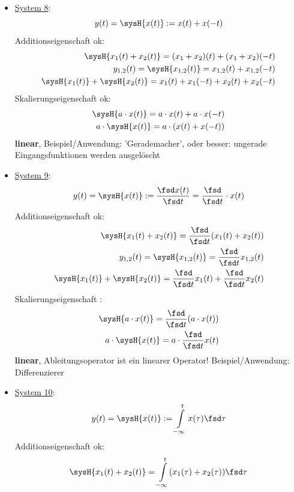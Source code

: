 \begin{Loesung}
\begin{itemize}
\item  \underline{System 8}:
\begin{equation}
y(t) = \sysH{x(t)}:= x(t) + x(-t)
\end{equation}
Additionseigenschaft ok:
\begin{align}
\sysH{x_1(t)+x_2(t)}=(x_1+x_2)(t)+(x_1+x_2)(-t)\\
y_{1,2}(t) = \sysH{x_{1,2}(t)}= x_{1,2}(t)+x_{1,2}(-t)\\
\sysH{x_1(t)} + \sysH{x_2(t)} = x_{1}(t)+x_{1}(-t) + x_{2}(t)+x_{2}(-t)
\end{align}
Skalierungseigenschaft ok:
\begin{align}
\sysH{a \cdot x(t)}= a \cdot x(t) + a \cdot x(-t)\\
a \cdot \sysH{x(t)}= a \cdot (x(t) + x(-t))
\end{align}
\textbf{linear}, Beispiel/Anwendung: 'Gerademacher', oder besser: ungerade
Eingangsfunktionen werden ausgelöscht
\item  \underline{System 9}:
\begin{equation}
y(t) = \sysH{x(t)}:= \frac{\fsd x(t)}{\fsd t} = \frac{\fsd}{\fsd t} \cdot x(t)
\end{equation}
Additionseigenschaft ok:
\begin{align}
\sysH{x_1(t)+x_2(t)}=\frac{\fsd}{\fsd t} (x_1(t)+x_2(t))\\
y_{1,2}(t) = \sysH{x_{1,2}(t)}= \frac{\fsd}{\fsd t} x_{1,2}(t)\\
\sysH{x_1(t)} + \sysH{x_2(t)} = \frac{\fsd}{\fsd t} x_{1}(t) + \frac{\fsd}{\fsd t} x_{2}(t)
\end{align}
Skalierungseigenschaft :
\begin{align}
\sysH{a \cdot x(t)}= \frac{\fsd}{\fsd t}(a \cdot x(t))\\
a \cdot \sysH{x(t)}= a\cdot \frac{\fsd}{\fsd t} x(t)
\end{align}
\textbf{linear}, Ableitungsoperator ist ein linearer Operator!
Beispiel/Anwendung: Differenzierer
\item  \underline{System 10}:
\begin{equation}
y(t) = \sysH{x(t)}:= \int\limits_{-\infty}^{t} x(\tau) \fsd \tau
\end{equation}
Additionseigenschaft ok:
\begin{align}
\sysH{x_1(t)+x_2(t)}= \int\limits_{-\infty}^{t} (x_1(\tau)+x_2(\tau)) \fsd \tau\\

\end{align}
\end{itemize}
\end{Loesung}
